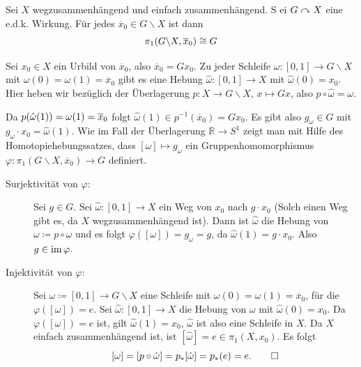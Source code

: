 \begin{satz}[{name=[Zusammenhang der Fundamentalgruppe mit einer e.d.k.-Wirkung]},label=satz:fund-edk]
	Sei $X$ wegzusammenhängend und einfach zusammenhängend. S
	ei $G \mathrel{\curvearrowright} X$ eine e.d.k. Wirkung. 
	Für jedes $\overline{x}_0 \in G \backslash X$ ist dann 
	\[
		\pi_1 \enbrace*{ G \backslash X, \overline{x}_0 } \cong G
	\]
\end{satz}
\begin{beweis}
	Sei $x_0 \in X$ ein Urbild von $\overline{x}_0$, also $\overline{x}_0 = G x_0 $. 
	Zu jeder Schleife $\omega \colon [0,1] \to G \backslash X$ mit $\omega(0) = \omega(1) = \overline{x}_0 $ gibt es eine Hebung $\hat{\omega} \colon [0,1] \to X$ mit $\hat{\omega}(0) = x_0$. 
	Hier heben wir bezüglich der Überlagerung $p \colon X \to G \backslash X$, $x \mapsto G x$, also $p \circ  \hat{\omega} = \omega$.

	Da $p \enbrace*{ \hat{\omega}(1)} = \omega(1) = \overline{x}_0 $ folgt $\hat{\omega}(1)\in p ^{-1} (\overline{x}_0 ) = G  x_0$.  
	Es gibt also $g_\omega \in G$ mit $g_\omega \cdot x_0 = \hat{\omega}(1)$. 
	Wie im Fall der Überlagerung $\mathbb{R} \to S^1$ zeigt man mit Hilfe des Homotopiehebungssatzes, dass $[\omega] \mapsto g_\omega$ ein Gruppenhomomorphismus $\varphi \colon \pi_1(G \backslash X, \overline{x}_0 ) \to G$ definiert. 
	\begin{description}
		\item[Surjektivität von $\varphi$:] Sei $g \in G$. 
		Sei $\hat{\omega} \colon [0,1] \to X$ ein Weg von $x_0$ nach $g \cdot x_0$ (Solch einen Weg gibt es, da $X$ wegzusammenhängend ist). 
		Dann ist $\hat{\omega}$ die Hebung von $\omega \coloneqq p \circ  \hat{\omega}$ und es folgt $\varphi( [\omega]) = g_\omega = g$, da $\hat{\omega}(1) = g \cdot  x_0$. 
		Also $g \in \operatorname{im} \varphi$.
		\item[Injektivität von $\varphi$:] Sei $\omega \coloneqq [0,1] \to G \backslash X$ eine Schleife mit $\omega(0)= \omega(1) = \overline{x}_0$, für die $\varphi([\omega]) = e$. 
		Sei $\hat{\omega} \colon [0,1] \to X$ die Hebung von $\omega$ mit $\hat{\omega}(0) = x_0$. 
		Da $\varphi([\omega]) = e$ ist, gilt $\hat{\omega}(1) = x_0$, $\hat{\omega}$ ist also eine Schleife in $X$. 
		Da $X$ einfach zusammenhängend ist, ist $[\hat{\omega}] = e \in \pi_1(X,x_0)$. 
		Es folgt 
		\[
			[\omega] = [p \circ  \hat{\omega}] = p_* [\hat{\omega}] = p_*(e) = e. \qedhere
		\]
	\end{description}
\end{beweis}

